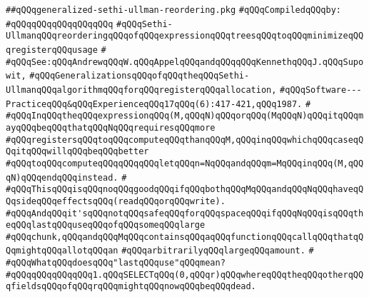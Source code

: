 \label{src/lib/compiler/back/top/lambdacode/generalized-sethi-ullman-reordering.pkg}
\verb|##qQQqgeneralized-sethi-ullman-reordering.pkg|\newline
\newline
\verb|#qQQqCompiledqQQqby:|\newline
\verb|#qQQqqQQqqQQqqQQqqQQq|\newline
\newline
\newline
\newline
\verb|#qQQqSethi-UllmanqQQqreorderingqQQqofqQQqexpressionqQQqtreesqQQqtoqQQqminimizeqQQqregisterqQQqusage|\newline
\verb|#|\newline
\verb|#qQQqSee:qQQqAndrewqQQqW.qQQqAppelqQQqandqQQqqQQqKennethqQQqJ.qQQqSupowit,|\newline
\verb|#qQQqGeneralizationsqQQqofqQQqtheqQQqSethi-UllmanqQQqalgorithmqQQqforqQQqregisterqQQqallocation,|\newline
\verb|#qQQqSoftware---PracticeqQQq&qQQqExperienceqQQq17qQQq(6):417-421,qQQq1987.|\newline
\verb|#|\newline
\verb|#qQQqInqQQqtheqQQqexpressionqQQq(M,qQQqN)qQQqorqQQq(MqQQqN)qQQqitqQQqmayqQQqbeqQQqthatqQQqNqQQqrequiresqQQqmore|\newline
\verb|#qQQqregistersqQQqtoqQQqcomputeqQQqthanqQQqM,qQQqinqQQqwhichqQQqcaseqQQqitqQQqwillqQQqbeqQQqbetter|\newline
\verb|#qQQqtoqQQqcomputeqQQqqQQqqQQqletqQQqn=NqQQqandqQQqm=MqQQqinqQQq(M,qQQqN)qQQqendqQQqinstead.|\newline
\verb|#|\newline
\verb|#qQQqThisqQQqisqQQqnoqQQqgoodqQQqifqQQqbothqQQqMqQQqandqQQqNqQQqhaveqQQqsideqQQqeffectsqQQq(readqQQqorqQQqwrite).|\newline
\verb|#qQQqAndqQQqit'sqQQqnotqQQqsafeqQQqforqQQqspaceqQQqifqQQqNqQQqisqQQqtheqQQqlastqQQquseqQQqofqQQqsomeqQQqlarge|\newline
\verb|#qQQqchunk,qQQqandqQQqMqQQqcontainsqQQqaqQQqfunctionqQQqcallqQQqthatqQQqmightqQQqallotqQQqan|\newline
\verb|#qQQqarbitrarilyqQQqlargeqQQqamount.|\newline
\verb|#|\newline
\verb|#qQQqWhatqQQqdoesqQQq"lastqQQquse"qQQqmean?|\newline
\verb|#qQQqqQQqqQQqqQQq1.qQQqSELECTqQQq(0,qQQqr)qQQqwhereqQQqtheqQQqotherqQQqfieldsqQQqofqQQqrqQQqmightqQQqnowqQQqbeqQQqdead.|\newline

